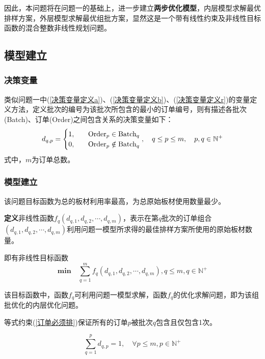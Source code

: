 \documentclass[bwprint]{gmcmthesis}
\begin{document}
因此，本问题将在问题一的基础上，进一步建立\textbf{两步优化模型}，内层模型求解最优排样方案，外层模型求解最优组批方案，显然这是一个带有线性约束及非线性目标函数的混合整数非线性规划问题。

\subsection{模型建立}


\subsubsection{决策变量}

类似问题一中(\ref{决策变量定义a})、(\ref{决策变量定义b})、(\ref{决策变量定义r})的变量定义方法，定义批次的编号为该批次所包含的最小的订单编号，则有描述各批次(Batch)、订单(Order)之间包含关系的决策变量如下：
\begin{equation}   %
    d_{q,p}=
    \begin{cases}
        1, \quad  & \text{Order}_p \in  \text{Batch}_q \\
        0,\quad  & \text{Order}_p \notin  \text{Batch}_q \\
    \end{cases},\quad q\le p \le m,\quad p,q \in  \mathbb{N}^+\\
\end{equation}
\noindent 式中，$m$为订单总数。


\subsubsection{模型建立}
该问题目标函数为总的板材利用率最高，为总原始板材使用数量最少。

\textbf{定义}非线性函数$f_q(d_{q,1},d_{q,2},\cdots,d_{q,m})$，表示在第$q$批次的订单组合$(d_{q,1},d_{q,2},\cdots,d_{q,m})$利用问题一模型所求得的最佳排样方案所使用的原始板材数量。

即有非线性目标函数
\begin{equation}   
    \mathbf{min}\quad\sum_{q=1}^{m} f_q(d_{q,1},d_{q,2},\cdots,d_{q,m}),q\le m ,q\in  \mathbb{N}^+\label{目标函数2}
\end{equation}

该目标函数中，函数$f_q$可利用问题一模型求解，函数$f_q$的优化求解问题，即为该组批优化的内层优化问题。

等式约束(\ref{订单必须排})保证所有的订单$p$被批次$q$包含且仅包含1次。

\begin{equation}   
    \sum_{q=1}^{p} d_{q,p}=1,\quad \forall p\le m,p \in \mathbb{N}^+ \label{订单必须排} 
\end{equation}
\end{document}
